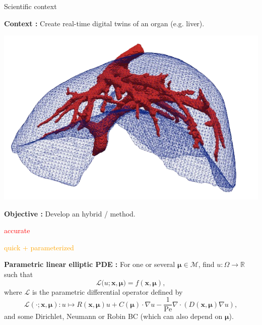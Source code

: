 \begin{frame}{Scientific context}
	\begin{minipage}{0.78\linewidth}
		\textbf{Context :} Create real-time digital twins of an organ (e.g. liver).
	\end{minipage}
	\begin{minipage}{0.18\linewidth}
		\vspace{-20pt}
		\includegraphics[width=0.95\linewidth]{images/intro/liver.png}
	\end{minipage}
	
	\vspace{1pt}
	\textbf{Objective :} Develop an hybrid  /  method.
	
	\vspace{1pt}
	\small
	\hspace{130pt} \begin{minipage}{0.14\linewidth}
		\textcolor{red}{accurate}
	\end{minipage} \hspace{8pt} \begin{minipage}{0.3\linewidth}
		\textcolor{orange}{quick + parameterized}
	\end{minipage}

	\normalsize
	\vspace{5pt}
	\textbf{Parametric linear elliptic PDE :}
	For one or several  $\bm{\mu}\in \mathcal{M}$, find $u: \Omega\to \mathbb{R}$ such that
	\begin{equation*}
		\mathcal{L}\big(u;\bm{x},\bm{\mu}\big) = f(\bm{x},\bm{\mu}),
	\end{equation*}
	where $\mathcal{L}$ is the parametric differential operator defined  by
	\begin{equation*}
		\mathcal{L}(\cdot;\bm{x},\bm{\mu}) : u \mapsto R(\bm{x},\bm{\mu}) u + C(\bm{\mu}) \cdot \nabla u - \frac{1}{\text{Pe}} \nabla \cdot (D(\bm{x},\bm{\mu}) \nabla u),
	\end{equation*}
	and some Dirichlet, Neumann or Robin BC (which can also depend on $\bm{\mu}$).
	

\end{frame}
